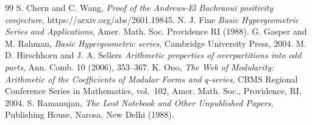 \documentclass[reqno]{amsart}
\theoremstyle{definition}
\theoremstyle{plain}
\theoremstyle{remark}
\numberwithin{equation}{section}
\begin{document}
\begin{thebibliography}{99}
S. Chern and C. Wang,
\emph{Proof of the Andrews-El Bachraoui positivity conjecture},
https://arxiv.org/abs/2601.19845.
%
N. J. Fine
\emph{Basic Hypergeometric Series and Applications},
Amer. Math. Soc. Providence RI (1988).
%
G. Gasper and M. Rahman,
\emph{Basic Hypergeometric series},
Cambridge University Press, 2004.
%
M. D. Hirschhorn and J. A. Sellers
\emph{Arithmetic properties of overpartitions into odd parts},
Ann. Comb. 10 (2006), 353--367.
%
K. Ono,
\emph{The Web of Modularity: Arithmetic of the Coefficients of Modular Forms and $q$-series},
CBMS Regional Conference Series in Mathematics, vol.~102,
Amer. Math. Soc., Providence, RI, 2004.
%
S. Ramanujan,
\emph{The Lost Notebook and Other Unpublished Papers},
Publishing House, Narosa, New Delhi (1988).
%
%
\end{thebibliography}
%
\end{document}
